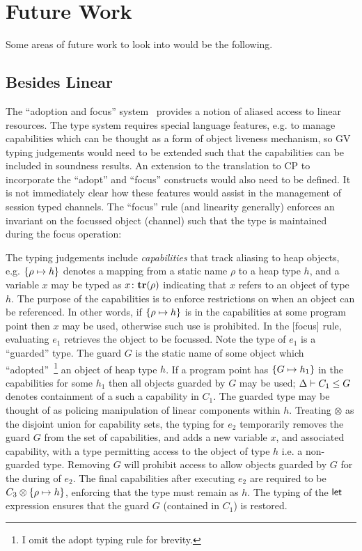 \section{Future Work}

Some areas of future work to look into would be the following.

\subsection{Besides Linear}

The ``adoption and focus'' system~\cite{Fahndrich:2002} provides a notion of
aliased access to linear resources. The type system requires special language
features, e.g. to manage capabilities which can be thought as a form of object
liveness mechanism, so GV typing judgements would need to be extended such
that the capabilities can be included in soundness results. An extension to
the translation to CP to incorporate the ``adopt'' and ``focus'' constructs
would also need to be defined. It is not immediately clear how these features
would assist in the management of session typed channels. The ``focus'' rule
(and linearity generally) enforces an invariant on the focussed object
(channel) such that the type is maintained during the focus operation:


The typing judgements include \emph{capabilities} that track aliasing to heap
objects, e.g. $\{{\rho} \mapsto {h}\}$ denotes a mapping from a static name $\rho$ to
a heap type $h$, and a variable $x$ may be typed as ${x}\colon{\mathbf{tr}({\rho})}$
indicating that $x$ refers to an object of type $h$. The purpose of the
capabilities is to enforce restrictions on when an object can be
referenced. In other words, if $\{{\rho} \mapsto {h}\}$ is in the capabilities at
some program point then $x$ may be used, otherwise such use is prohibited. In
the [focus] rule, evaluating $e_1$ retrieves the object to be focussed. Note
the type of $e_1$ is a ``guarded'' type. The guard $G$ is the static name of
some object which ``adopted''~\footnote{I omit the adopt typing rule for
  brevity.} an object of heap type $h$. If a program point has
$\{{G} \mapsto {h_1}\}$ in the capabilities for some $h_1$ then all objects guarded
by $G$ may be used; ${\Delta}\vdash{C_1}\leq{G}$ denotes containment of a
such a capability in $C_1$. The guarded type may be thought of as policing
manipulation of linear components within $h$. Treating $\otimes$ as the
disjoint union for capability sets, the typing for $e_2$ temporarily removes
the guard $G$ from the set of capabilities, and adds a new variable $x$, and
associated capability, with a type permitting access to the object of type $h$
i.e. a non-guarded type. Removing $G$ will prohibit access to allow objects
guarded by $G$ for the during of $e_2$. The final capabilities after executing
$e_2$ are required to be ${C_3}\otimes{\{{\rho} \mapsto {h}\}}$, enforcing that the
type must remain as $h$. The typing of the $\mathsf{let}$ expression ensures that
the guard $G$ (contained in $C_1$) is restored.

